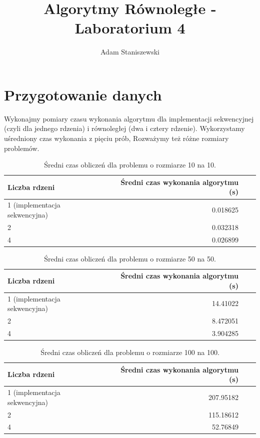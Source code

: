 \documentclass{article}
\title{Algorytmy Równoległe - Laboratorium 4}
\author{Adam Staniszewski}
\begin{document}
\maketitle

\section*{Przygotowanie danych}
Wykonajmy pomiary czasu wykonania algorytmu dla implementacji sekwencyjnej (czyli dla jednego rdzenia) i równoległej (dwa i cztery rdzenie). Wykorzystamy uśredniony czas wykonania z pięciu prób, Rozważymy też różne rozmiary problemów.
\begin{table}[ht]
\centering
\begin{tabular}{|l|r|r|r|}
\hline
\rowcolor{orange!40} 
Liczba rdzeni & Średni czas wykonania algorytmu (s) \\\hline
1 (implementacja sekwencyjna) & 0.018625 \\\hline
2 & 0.032318 \\\hline
4 &  0.026899 \\\hline

\end{tabular}
\caption{\label{tab:widgets}Średni czas obliczeń dla problemu o rozmiarze 10 na 10.}
\end{table}

\begin{table}[ht]
\centering
\begin{tabular}{|l|r|r|r|}
\hline
\rowcolor{orange!40} 
Liczba rdzeni & Średni czas wykonania algorytmu (s)\\\hline
1 (implementacja sekwencyjna) & 14.41022 \\\hline
2 & 8.472051 \\\hline
4 & 3.904285 \\\hline

\end{tabular}
\caption{\label{tab:widgets}Średni czas obliczeń dla problemu o rozmiarze 50 na 50.}
\end{table}

\begin{table}[ht]
\centering
\begin{tabular}{|l|r|r|r|}
\hline
\rowcolor{orange!40} 
Liczba rdzeni & Średni czas wykonania algorytmu (s)\\\hline
1 (implementacja sekwencyjna) & 207.95182 \\\hline
2 & 115.18612 \\\hline
4 & 52.76849 \\\hline

\end{tabular}
\caption{\label{tab:widgets}Średni czas obliczeń dla problemu o rozmiarze 100 na 100.}
\end{table}
\end{document}

